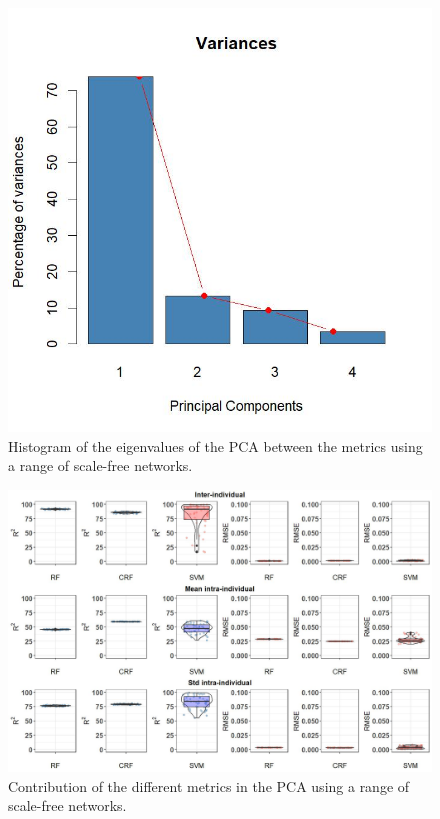 \documentclass[
]{article}
\begin{document}
\begin{figure}[!H]

{\centering \includegraphics{./Figures/unnamed-chunk-89-1} 

}

\caption{Histogram of the eigenvalues of the PCA between the metrics using a range of scale-free networks.}\label{fig:unnamed-chunk-89}
\end{figure}

\begin{figure}[!H]

{\centering \includegraphics{./Figures/unnamed-chunk-90-1} 

}

\caption{Contribution of the different metrics in the PCA using a range of scale-free networks.}\label{fig:unnamed-chunk-90}
\end{figure}
\end{document}

